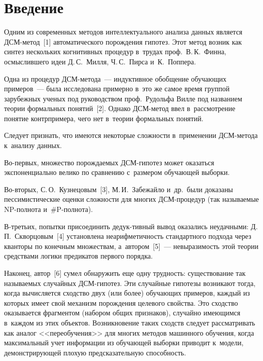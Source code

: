 \begin{multicols}{2}

\label{st\stat}

\section{Введение}

    Одним из современных методов интеллектуального анализа данных 
является ДСМ-ме\-тод~[1] автоматического порождения гипотез. Этот метод 
возник как синтез нескольких когнитивных процедур в~трудах проф.\ 
В.\,К.~Финна, осмыслившего идеи Д.\,С.~Милля, Ч.\,С.~Пирса 
и~К.~Поппера.
    
    Одна из процедур ДСМ-ме\-то\-да~--- индуктивное обобщение 
обучающих примеров~--- была исследована примерно в~это же самое время 
группой зарубежных ученых под руководством проф.\ Рудольфа Вилле под 
названием теории формальных понятий~[2]. Однако ДСМ-ме\-тод ввел 
в~рас\-смот\-ре\-ние понятие контрпримера, чего нет в~теории формальных 
понятий.
    
    Следует признать, что имеются некоторые сложности в~применении 
ДСМ-ме\-то\-да к~анализу данных.
    
    Во-первых, множество порождаемых ДСМ-ги\-по\-тез может оказаться 
экспоненциально велико по сравнению с~размером обучающей выборки.
    
    Во-вторых, С.\,О.~Кузнецовым~[3], М.\,И.~Забежайло и~др.\ были 
доказаны пессимистические оценки сложности для многих ДСМ-про\-це\-дур 
(так называемые NP-пол\-но\-та и~\#P-пол\-но\-та).
    
    В-третьих, попытки присоединить де\-дук-\linebreak тивный вывод оказались 
неудачными: Д.\,П.~Сквор\-цовым~[4] установлена неарифметичность 
стандартного подхода через кванторы по конечным \mbox{множествам}, 
а~автором~[5]~--- невыразимость этой теории средствами логики предикатов 
первого порядка.
    
    Наконец, автор~[6] сумел обнаружить еще одну трудность: 
существование так называемых случайных ДСМ-ги\-по\-тез. Эти случайные 
гипотезы возникают тогда, когда вычисляется сходство двух (или более) 
обучающих примеров, каждый из которых имеет свой механизм порождения 
целевого свойства. Это сходство оказывается фрагментом (набором общих 
признаков), случайно имеющимся в~каждом из этих объектов. Возникновение 
таких сходств следует рассматривать как аналог <<пе\-ре\-обуче\-ния>> для 
многих методов машинного обуче\-ния, когда максимальный учет информации 
из обуча\-ющей выборки приводит к~модели, де\-мон\-ст\-ри\-ру\-ющей плохую 
предсказательную способность.
    

\end{multicols}
